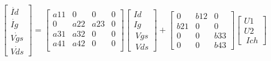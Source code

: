 \documentclass{article}
\begin{document}
\begin{gather}

 \begin{bmatrix}  \dot{Id} \\  \dot{Ig}  \\ \dot{Vgs}  \\ \dot{Vds} \end{bmatrix}
 =
  \begin{bmatrix}
   
   a11 & 0 & 0 & 0 \\
    0 & a22 & a23 & 0 \\
     a31 & a32 & 0 & 0 \\
      a41 & a42 & 0 & 0 \\
   \end{bmatrix} \begin{bmatrix}  Id \\  Ig  \\ \ Vgs  \\ \ Vds \end{bmatrix} 
   + \begin{bmatrix}
   
    0 & b12 & 0 \\
    b21 & 0 & 0 \\
    0 & 0 & b33  \\
    0 & 0 & b43     
    \end{bmatrix}  \begin{bmatrix}  U1 \\  U2  \\ \ Ich \end{bmatrix} 
   
   
\end{gather}
\end{document}
